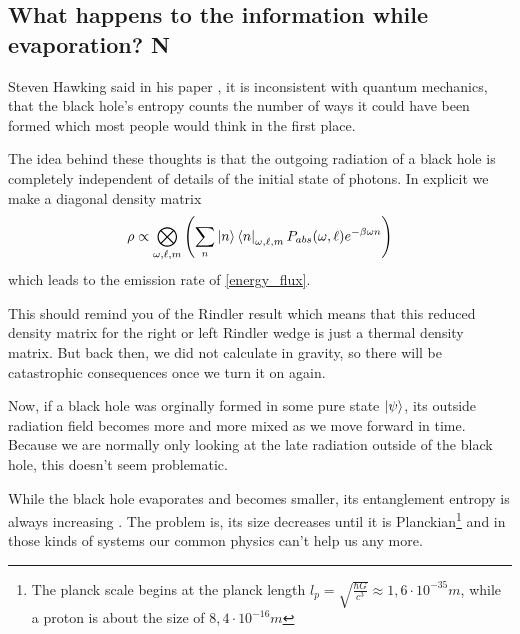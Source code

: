 \subsection{What happens to the information while evaporation? N}
	Steven Hawking said in his paper \cite{Hawking2}, it is inconsistent with quantum mechanics, that the black hole's entropy counts the number of ways it could have been formed which most people would think in the first place. 
	
	The idea behind these thoughts is that the outgoing radiation of a black hole is completely independent of details of the initial state of photons. 
	In explicit we make a diagonal density matrix
		\begin{equation} \label{density matrix informprobl}
			\rho \propto \bigotimes_{\omega, \ell, m} \left(
			\sum_n \ket{n} \bra{n}_{\omega, \ell, m} P_{abs} (\omega, \ell) e^{-\beta \omega n}
			\right)
		\end{equation}
	which leads to the emission rate of \eqref{energy_flux}.
		
	This should remind you of the Rindler result which means that this reduced density matrix for the right or left Rindler wedge is just a thermal density matrix. But back then, we did not calculate in gravity, so there will be catastrophic consequences once we turn it on again.
		
	Now, if a black hole was orginally formed in some pure state $\ket{\psi}$, its outside radiation field becomes more and more mixed as we move forward in time. Because we are normally only looking at the late radiation outside of the black hole, this doesn't seem problematic. 
		
	While the black hole evaporates and becomes smaller, its entanglement entropy is always increasing 
	. The problem is, its size decreases until it is Planckian\footnote{The planck scale begins at the planck length $l_p = \sqrt{\frac{\hbar G}{c^3}} \approx 1,6 \cdot 10^{-35}\unit{m}$, while a proton is about the size of $8,4 \cdot 10^{-16}\unit{m}$} and in those kinds of systems our common physics can't help us any more.
	
